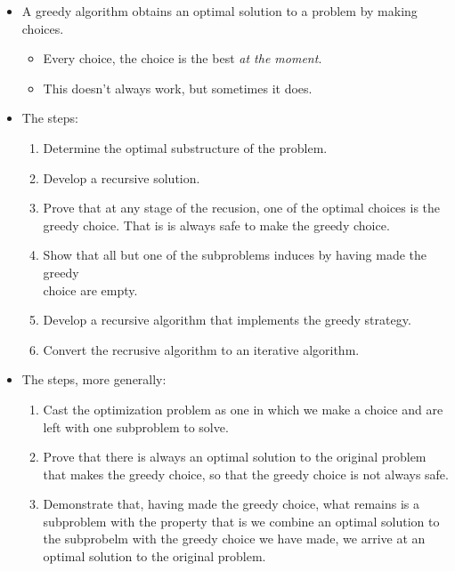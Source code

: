 \documentclass[a4paper,11pt]{article}
\begin{document}
\begin{itemize}
\itemsep1pt\parskip0pt
\item
  A greedy algorithm obtains an optimal solution to a problem by making
  choices.

  \begin{itemize}
  \itemsep1pt\parskip0pt
  \item
    Every choice, the choice is the best \emph{at the moment}.
  \item
    This doesn't always work, but sometimes it does.
  \end{itemize}
\item
  The steps:

  \begin{enumerate}
  \def\labelenumi{\arabic{enumi}.}
  \itemsep1pt\parskip0pt
  \item
    Determine the optimal substructure of the problem.
  \item
    Develop a recursive solution.
  \item
    Prove that at any stage of the recusion, one of the optimal choices
    is the greedy choice. That is is always safe to make the greedy
    choice.
  \item
    Show that all but one of the subproblems induces by having made the
    greedy\\ choice are empty.
  \item
    Develop a recursive algorithm that implements the greedy strategy.
  \item
    Convert the recrusive algorithm to an iterative algorithm.
  \end{enumerate}
\item
  The steps, more generally:

  \begin{enumerate}
  \def\labelenumi{\arabic{enumi}.}
  \itemsep1pt\parskip0pt
  \item
    Cast the optimization problem as one in which we make a choice and
    are left with one subproblem to solve.
  \item
    Prove that there is always an optimal solution to the original
    problem that makes the greedy choice, so that the greedy choice is
    not always safe.
  \item
    Demonstrate that, having made the greedy choice, what remains is a
    subproblem with the property that is we combine an optimal solution
    to the subprobelm with the greedy choice we have made, we arrive at
    an optimal solution to the original problem.
  \end{enumerate}
\end{itemize}
\end{document}
